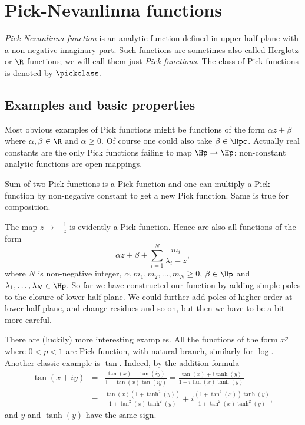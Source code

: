 \chapter{Pick-Nevanlinna functions}

\textit{Pick-Nevanlinna function} is an analytic function defined in upper half-plane with a non-negative imaginary part. Such functions are sometimes also called Herglotz or $\R$ functions; we will call them just \textit{Pick functions}. The class of Pick functions is denoted by $\pickclass$.

\section{Examples and basic properties}

Most obvious examples of Pick functions might be functions of the form $\alpha z + \beta$ where $\alpha, \beta \in \R$ and $\alpha \geq 0$. Of course one could also take $\beta \in \Hpc$. Actually real constants are the only Pick functions failing to map $\Hp \to \Hp$: non-constant analytic functions are open mappings.

Sum of two Pick functions is a Pick function and one can multiply a Pick function by non-negative constant to get a new Pick function. Same is true for composition.

The map $z \mapsto -\frac{1}{z}$ is evidently a Pick function. Hence are also all functions of the form
\[
	\alpha z + \beta + \sum_{i = 1}^{N} \frac{m_{i}}{\lambda_{i}- z},
\]
where $N$ is non-negative integer, $\alpha, m_{1}, m_{2}, \ldots, m_{N} \geq 0$, $\beta \in \Hp$ and $\lambda_{1}, \ldots, \lambda_{N} \in \Hp$. So far we have constructed our function by adding simple poles to the closure of lower half-plane. We could further add poles of higher order at lower half plane, and change residues and so on, but then we have to be a bit more careful.

There are (luckily) more interesting examples. All the functions of the form $x^{p}$ where $0 < p < 1$ are Pick function, with natural branch, similarly for $\log$. Another classic example is $\tan$. Indeed, by the addition formula
\begin{eqnarray*}
	\tan(x + i y) &=& \frac{\tan(x) + \tan(i y)}{1 - \tan(x) \tan(i y)} = \frac{\tan(x) + i \tanh(y)}{1 - i \tan(x) \tanh(y)} \\
	&=& \frac{\tan(x)(1 + \tanh^2(y))}{1 + \tan^2(x) \tanh^2(y)} + i \frac{(1 + \tan^2(x))\tanh(y)}{1 + \tan^2(x) \tanh^2(y)},
\end{eqnarray*}
and $y$ and $\tanh(y)$ have the same sign.

